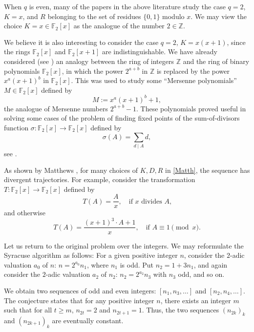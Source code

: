 \documentclass [12pt]{article}
\begin{document}
When $q$ is even, many of the papers in the above literature study the case
$q=2$, $K = x$, and $R$ belonging to the set of residues $\{0,1\}$ modulo $x$. We may view the choice $K = x \in \mathbb{F}_2[x]$ as the analogue of the number $2 \in \mathbb{Z}$.

We believe it is also interesting to consider the case $q=2$, $K = x(x+1)$, since the rings $\mathbb{F}_2[x]$ and $\mathbb{F}_2[x+1]$ are indistinguishable. We have already considered (see \cite{Gall-Rahav2019}) an analogy between the ring of integers $\mathbb{Z}$ and the ring of binary polynomials $\mathbb{F}_2[x]$, in which the power $2^{a+b}$ in $\mathbb{Z}$ is replaced by the power $x^a(x+1)^b$ in $\mathbb{F}_2[x]$. This was used to study some ``Mersenne polynomials'' $M \in \mathbb{F}_2[x]$ defined by
\[ M := x^a(x+1)^b + 1, \]
the analogue of Mersenne numbers $2^{a+b} - 1$. These polynomials proved useful in solving some cases of the problem of finding fixed points of the sum-of-divisors function $\sigma \colon \mathbb{F}_2[x] \to \mathbb{F}_2[x]$ defined by
\begin{equation}\label{perfects}
\sigma(A) = \sum_{d \mid A} d,
\end{equation}
see \cite{Gall-Rahav2007, Gall-Rahav2016}.  

As shown by Matthews \cite{Matthews}, for many choices of $K,D,R$ in \eqref{Matth}, the sequence has divergent trajectories. For example, consider the transformation $T \colon \mathbb{F}_2[x] \to \mathbb{F}_2[x]$ defined by
\[
T(A) = \frac{A}{x}, \quad \text{if $x$ divides $A$,}
\]
and otherwise
\begin{equation}\label{MatthEx1}
T(A) = \frac{(x+1)^3 \cdot A + 1}{x}, \quad \text{if } A \equiv 1 \pmod{x}.
\end{equation}

Let us return to the original problem over the integers.
We may reformulate the Syracuse algorithm as follows: For a given positive integer $n$, consider the $2$-adic valuation $a_0$ of $n$: $n = 2^{a_0} n_1$, where $n_1$ is odd. Put $n_2 = 1 + 3n_1$, and again consider the $2$-adic valuation $a_2$ of $n_2$: $n_2 = 2^{a_2} n_3$ with $n_3$ odd, and so on.  

We obtain two sequences of odd and even integers: $[n_1, n_3,\ldots]$ and $[n_2, n_4,\ldots]$. The conjecture states that for any positive integer $n$, there exists an integer $m$ such that for all $t \geq m$, $n_{2t}= 2$ and $n_{2t+1}= 1$. Thus, the two sequences $(n_{2k})_k$ and $(n_{2k+1})_k$ are eventually constant.
\end{document}
